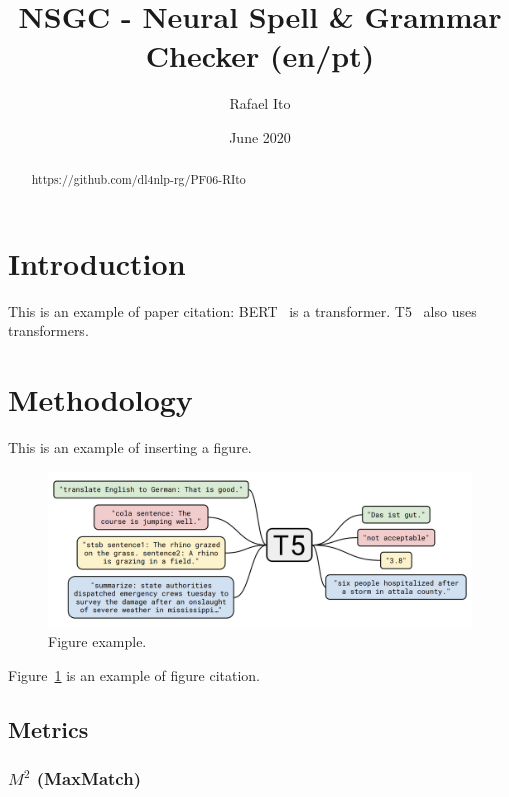 \documentclass{article}
\title{NSGC - Neural Spell \& Grammar Checker (en/pt)}
\author{Rafael Ito}
\date{June 2020}
\begin{document}
\maketitle

\begin{abstract}

https://github.com/dl4nlp-rg/PF06-RIto
\end{abstract}

\section{Introduction}

This is an example of paper citation: BERT~\cite{devlin2018bert} is a transformer. T5~\cite{raffel2019exploring} also uses transformers.

\section{Methodology} 

This is an example of inserting a figure. 

\begin{figure}[ht]
\centering
\includegraphics[width=.77\textwidth]{t5.png}
\caption{\label{fig:t5}Figure example.}
\end{figure}

Figure~\ref{fig:t5} is an example of figure citation.

\subsection{Metrics}

\subsubsection{$M^2$ (MaxMatch)}
\end{document}
